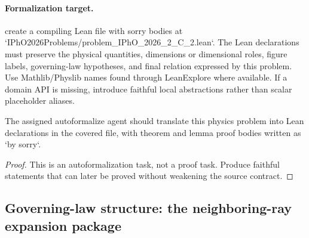 \paragraph{Formalization target.}
create a compiling Lean file with sorry bodies at `IPhO2026Problems/problem\_IPhO\_2026\_2\_C\_2.lean`.
The Lean declarations must preserve the physical quantities, dimensions or dimensional roles, figure labels, governing-law hypotheses, and final relation expressed by this problem.
Use Mathlib/Physlib names found through LeanExplore where available. If a domain API is missing, introduce faithful local abstractions rather than scalar placeholder aliases.

\begin{theorem}
\label{thm:physics:IPhO_2026_2_C_2:target}
The assigned autoformalize agent should translate this physics problem into Lean declarations in the covered file, with theorem and lemma proof bodies written as `by sorry`.
\end{theorem}
\begin{proof}
This is an autoformalization task, not a proof task. Produce faithful statements that can later be proved without weakening the source contract.
\end{proof}

\subsection*{Governing-law structure: the neighboring-ray expansion package}

